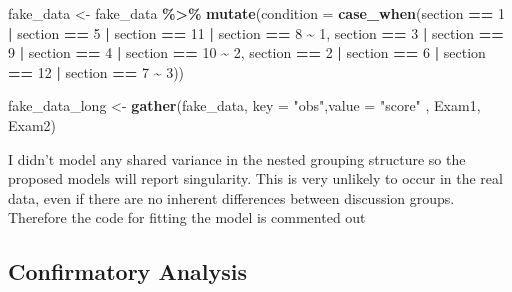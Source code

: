 \documentclass[
]{article}
\newenvironment{Shaded}{\begin{snugshade}}{\end{snugshade}}
\newcommand{\AttributeTok}[1]{\textcolor[rgb]{0.13,0.29,0.53}{#1}}
\newcommand{\DecValTok}[1]{\textcolor[rgb]{0.00,0.00,0.81}{#1}}
\newcommand{\FunctionTok}[1]{\textcolor[rgb]{0.13,0.29,0.53}{\textbf{#1}}}
\newcommand{\NormalTok}[1]{#1}
\newcommand{\OtherTok}[1]{\textcolor[rgb]{0.56,0.35,0.01}{#1}}
\newcommand{\SpecialCharTok}[1]{\textcolor[rgb]{0.81,0.36,0.00}{\textbf{#1}}}
\newcommand{\StringTok}[1]{\textcolor[rgb]{0.31,0.60,0.02}{#1}}
\begin{document}
\begin{Shaded}
\begin{Highlighting}[]
\NormalTok{fake\_data }\OtherTok{\textless{}{-}}\NormalTok{ fake\_data }\SpecialCharTok{\%\textgreater{}\%} \FunctionTok{mutate}\NormalTok{(}\AttributeTok{condition =} \FunctionTok{case\_when}\NormalTok{(section }\SpecialCharTok{==} \DecValTok{1} \SpecialCharTok{|}\NormalTok{ section }\SpecialCharTok{==} \DecValTok{5} \SpecialCharTok{|}\NormalTok{ section }\SpecialCharTok{==} \DecValTok{11} \SpecialCharTok{|}\NormalTok{ section }\SpecialCharTok{==} \DecValTok{8} \SpecialCharTok{\textasciitilde{}} \DecValTok{1}\NormalTok{, section }\SpecialCharTok{==} \DecValTok{3} \SpecialCharTok{|}\NormalTok{ section }\SpecialCharTok{==} \DecValTok{9} \SpecialCharTok{|}\NormalTok{ section }\SpecialCharTok{==} \DecValTok{4} \SpecialCharTok{|}\NormalTok{ section }\SpecialCharTok{==} \DecValTok{10} \SpecialCharTok{\textasciitilde{}} \DecValTok{2}\NormalTok{, section }\SpecialCharTok{==} \DecValTok{2} \SpecialCharTok{|}\NormalTok{ section }\SpecialCharTok{==} \DecValTok{6} \SpecialCharTok{|}\NormalTok{ section }\SpecialCharTok{==} \DecValTok{12} \SpecialCharTok{|}\NormalTok{ section }\SpecialCharTok{==} \DecValTok{7} \SpecialCharTok{\textasciitilde{}} \DecValTok{3}\NormalTok{))}

\NormalTok{fake\_data\_long }\OtherTok{\textless{}{-}} \FunctionTok{gather}\NormalTok{(fake\_data, }\AttributeTok{key =} \StringTok{"obs"}\NormalTok{,}\AttributeTok{value =} \StringTok{"score"}\NormalTok{ , Exam1, Exam2)}
\end{Highlighting}
\end{Shaded}

I didn't model any shared variance in the nested grouping structure so
the proposed models will report singularity. This is very unlikely to
occur in the real data, even if there are no inherent differences
between discussion groups. Therefore the code for fitting the model is
commented out

\subsection{Confirmatory Analysis}\label{confirmatory-analysis}
\end{document}
